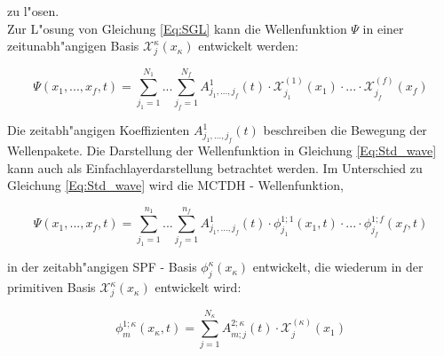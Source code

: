 zu l"osen.
  \\Zur L"osung von Gleichung \ref{Eq:SGL} kann die Wellenfunktion $\Psi$ in einer zeitunabh"angigen Basis $\mathcal{X}^{\kappa}_{j}(x_{\kappa})$ entwickelt werden:

 \begin{equation}
 \Psi(x_{1},..., x_{f}, t)=\sum^{N_{1}}_{j_{1}=1} ... \sum^{N_{f}}_{j_{f}=1} A^{1}_{j_{1}, ..., j_{f}}(t)\cdot \mathcal{X}^{(1)}_{j_{1}}(x_{1}) \cdot ... \cdot \mathcal{X}^{(f)}_{j_{f}}(x_{f})
 \label{Eq:Std_wave}
 \end{equation}

Die zeitabh"angigen Koeffizienten $A^{1}_{j_{1}, ..., j_{f}}(t)$ beschreiben die Bewegung der Wellenpakete.
Die Darstellung der Wellenfunktion in Gleichung  \ref{Eq:Std_wave} kann auch als Einfachlayerdarstellung betrachtet werden.
Im Unterschied zu Gleichung \ref{Eq:Std_wave} wird die MCTDH - Wellenfunktion,

 \begin{equation}
 \Psi(x_{1},..., x_{f}, t)=\sum^{n_{1}}_{j_{1}=1} ... \sum^{n_{f}}_{j_{f}=1} A^{1}_{j_{1}, ..., j_{f}}(t)
 \cdot \phi^{1;1}_{j_{1}}(x_{1}, t) \cdot ... \cdot \phi^{1;f}_{j_{f}}(x_{f}, t)
 \label{Eq:mctdh_wave}
 \end{equation}

in der zeitabh"angigen SPF - Basis $\phi^{\kappa}_{j}(x_{\kappa})$ entwickelt, die wiederum in der primitiven Basis $\mathcal{X}^{\kappa}_{j}(x_{\kappa})$ entwickelt wird:

\begin{equation}
 \phi^{1;\kappa}_{m} (x_{\kappa}, t)=\sum^{N_{\kappa}}_{j=1} A^{2;\kappa}_{m;j}(t) \cdot \mathcal{X}^{(\kappa)}_{j}(x_{1})
 \label{Eq:SPF}
 \end{equation}

